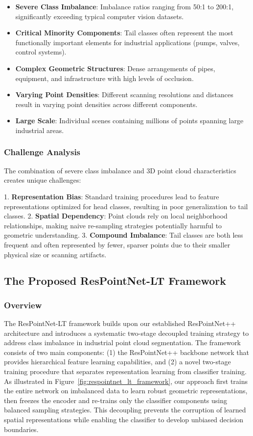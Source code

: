 \documentclass[preprint,12pt]{elsarticle}
\begin{document}
\begin{itemize}
    \item \textbf{Severe Class Imbalance}: Imbalance ratios ranging from 50:1 to 200:1, significantly exceeding typical computer vision datasets.
    \item \textbf{Critical Minority Components}: Tail classes often represent the most functionally important elements for industrial applications (pumps, valves, control systems).
    \item \textbf{Complex Geometric Structures}: Dense arrangements of pipes, equipment, and infrastructure with high levels of occlusion.
    \item \textbf{Varying Point Densities}: Different scanning resolutions and distances result in varying point densities across different components.
    \item \textbf{Large Scale}: Individual scenes containing millions of points spanning large industrial areas.
\end{itemize}

\subsubsection{Challenge Analysis}
The combination of severe class imbalance and 3D point cloud characteristics creates unique challenges:

1. \textbf{Representation Bias}: Standard training procedures lead to feature representations optimized for head classes, resulting in poor generalization to tail classes.
2. \textbf{Spatial Dependency}: Point clouds rely on local neighborhood relationships, making naive re-sampling strategies potentially harmful to geometric understanding.
3. \textbf{Compound Imbalance}: Tail classes are both less frequent and often represented by fewer, sparser points due to their smaller physical size or scanning artifacts.

\subsection{The Proposed ResPointNet-LT Framework}
\label{sec:respointnet_lt}

\subsubsection{Overview}
The ResPointNet-LT framework builds upon our established ResPointNet++ architecture and introduces a systematic two-stage decoupled training strategy to address class imbalance in industrial point cloud segmentation. The framework consists of two main components: (1) the ResPointNet++ backbone network that provides hierarchical feature learning capabilities, and (2) a novel two-stage training procedure that separates representation learning from classifier training. As illustrated in Figure~\ref{fig:respointnet_lt_framework}, our approach first trains the entire network on imbalanced data to learn robust geometric representations, then freezes the encoder and re-trains only the classifier components using balanced sampling strategies. This decoupling prevents the corruption of learned spatial representations while enabling the classifier to develop unbiased decision boundaries.
\end{document}
